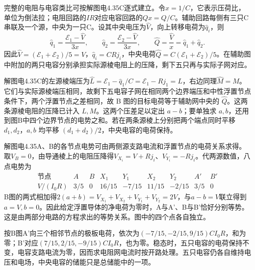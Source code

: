 \documentclass[UTF8,fontset=fandol,a4paper,11pt]{ctexart}
\begin{document}
完整的电阻与电容类比可按解图电4.35C逐式建立。令$x=1/C$，它表示压荷比，单位为倒法拉；电阻回路的$IR$对应电容回路的$Qx=Q/C$。辅助回路每侧有三只C串联及一个源，中央为一只C。设其中央电压为$\widehat V$，向上转移电荷为$\widehat q_i$，则
\[
\widehat q_1=\frac{\mathcal E_1-\widehat V}{3x},\qquad
\widehat q_2=\frac{\mathcal E_2-\widehat V}{3x},\qquad
\widehat Q=\frac{\widehat V}{x}=\widehat q_1+\widehat q_2.
\]
因此$\widehat V=(\mathcal E_1+\mathcal E_2)/5=V$，$\widehat q_i=CRj_i$，中央电荷$\widehat Q=C(\mathcal E_1+\mathcal E_2)/5$。在辅助图中附加的两只电容分别承担实际源棱电阻上的压降，剩下五只再与实际子网对应。

解图电4.35C的左源棱端压为$\widehat L=\mathcal E_1-\widehat q_1/C=\mathcal E_1-Rj_1=L$，右边同理$\widehat M=M$。它们与实际源棱端压相同，故剩下五电容子网在相同两个边界端压和中性浮置节点条件下，两个浮置节点之差相同，故 B 图的目标电荷等于辅助网中央的 $\widehat Q$。这两条源棱电阻的压降已计入 $L,M$。这两个压差足以定出 $a-b$；要单独求 $a,b$，还用到图B中四个边界节点的电势之和。若在两条源棱上分别把两个端点同时平移 $d_1,d_2$，$a,b$ 均平移 $(d_1+d_2)/2$，中央电容的电荷保持。

解图电4.35A、B的各节点电势可由两侧源支路电流和浮置节点的电荷关系求得。取$V_B=0$，由导通棱上的电阻压降得$V_{X_i}=V+Rj_i$、$V_{Y_i}=-Rj_i$。代两源数值，八点电势为
\[
\begin{array}{c|rrrrrrrr}
\text{节点}&A&B&X_1&Y_1&X_2&Y_2&A'&B'\\\hline
V/(I_0R)&3/5&0&16/15&-7/15&11/15&-2/15&3/5&0
\end{array}
\]
B图的两式相加得$2(a+b)=V_{X_1}+V_{X_2}+V_{Y_1}+V_{Y_2}=2V$，与$a-b=V$联立得到$a=V,b=0$。因此给定浮置导体的净电荷为零时，A与A'、B与B'恰好分别等势。这是由两部分电路的方程求出的等势关系。图中的四个点各自独立。

按B图A'向三个相邻节点的极板电荷，依次为$(-7/15,-2/15,9/15)CI_0R$，和为零；B'对应$(7/15,2/15,-9/15)CI_0R$，也为零。稳态时，五只电容的电荷保持不变，电容支路电流为零，因而求电阻网电流时按开路处理。五只电容仍各自维持电压和电场，中央电容的储能只是总储能中的一项。
\end{document}

